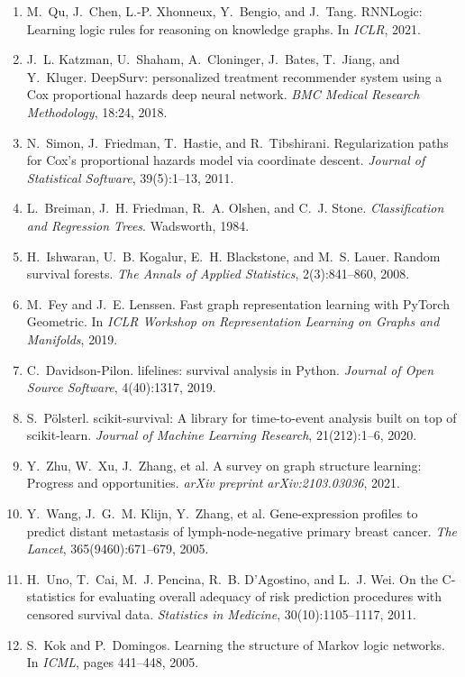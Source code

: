 \documentclass{mnnit}
\begin{document}
\begin{enumerate}
\item\label{ref:rnnlogic} M.~Qu, J.~Chen, L.-P. Xhonneux, Y.~Bengio, and J.~Tang. RNNLogic: Learning logic rules for reasoning on knowledge graphs. In \emph{ICLR}, 2021.
\item\label{ref:deepsurv} J.~L. Katzman, U.~Shaham, A.~Cloninger, J.~Bates, T.~Jiang, and Y.~Kluger. DeepSurv: personalized treatment recommender system using a Cox proportional hazards deep neural network. \emph{BMC Medical Research Methodology}, 18:24, 2018.
\item\label{ref:coxnet} N.~Simon, J.~Friedman, T.~Hastie, and R.~Tibshirani. Regularization paths for Cox's proportional hazards model via coordinate descent. \emph{Journal of Statistical Software}, 39(5):1--13, 2011.
\item\label{ref:cart} L.~Breiman, J.~H. Friedman, R.~A. Olshen, and C.~J. Stone. \emph{Classification and Regression Trees}. Wadsworth, 1984.
\item\label{ref:rsf} H.~Ishwaran, U.~B. Kogalur, E.~H. Blackstone, and M.~S. Lauer. Random survival forests. \emph{The Annals of Applied Statistics}, 2(3):841--860, 2008.
\item\label{ref:pyg} M.~Fey and J.~E. Lenssen. Fast graph representation learning with PyTorch Geometric. In \emph{ICLR Workshop on Representation Learning on Graphs and Manifolds}, 2019.
\item\label{ref:lifelines} C.~Davidson-Pilon. lifelines: survival analysis in Python. \emph{Journal of Open Source Software}, 4(40):1317, 2019.
\item\label{ref:sksurv} S.~P\"olsterl. scikit-survival: A library for time-to-event analysis built on top of scikit-learn. \emph{Journal of Machine Learning Research}, 21(212):1--6, 2020.
\item\label{ref:gslsurvey} Y.~Zhu, W.~Xu, J.~Zhang, et al. A survey on graph structure learning: Progress and opportunities. \emph{arXiv preprint arXiv:2103.03036}, 2021.
\item\label{ref:gse2034} Y.~Wang, J.~G.~M. Klijn, Y.~Zhang, et al. Gene-expression profiles to predict distant metastasis of lymph-node-negative primary breast cancer. \emph{The Lancet}, 365(9460):671--679, 2005.
\item\label{ref:uno} H.~Uno, T.~Cai, M.~J. Pencina, R.~B. D'Agostino, and L.~J. Wei. On the C-statistics for evaluating overall adequacy of risk prediction procedures with censored survival data. \emph{Statistics in Medicine}, 30(10):1105--1117, 2011.
\item\label{ref:mlnstructure} S.~Kok and P.~Domingos. Learning the structure of Markov logic networks. In \emph{ICML}, pages 441--448, 2005.

\end{enumerate}
\end{document}
